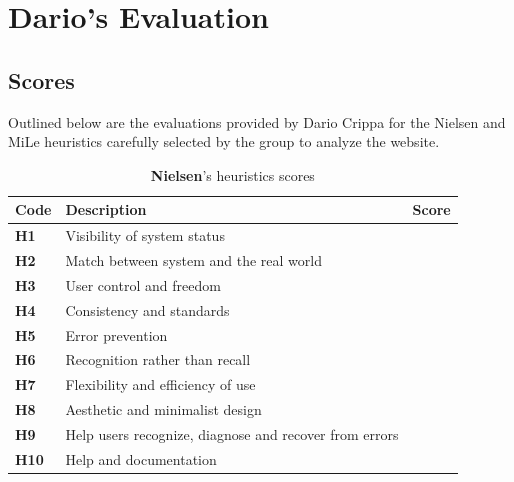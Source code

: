 \section{Dario's Evaluation}
\subsection{Scores}
Outlined below are the evaluations provided by Dario Crippa for the Nielsen and MiLe heuristics carefully selected by the group to analyze the website.\\
\begin{table}[htp!]
    \centering
    \begin{tabular}{ |l|l|c| }
        \hline
        \textbf{Code} & \textbf{Description} & \textbf{Score}\\
        \hline
        \textbf{H1} & Visibility of system status & \textbf{\color{unicefOrange}{3}}\\
        \hline
        \textbf{H2} & Match between system and the real world & \textbf{\color{unicefGreen}{5}}\\
        \hline
        \textbf{H3} & User control and freedom & \textbf{\color{unicefRed}{2}}\\
        \hline
        \textbf{H4} & Consistency and standards & \textbf{\color{unicefGreen}{5}}\\
        \hline
        \textbf{H5} & Error prevention & \textbf{\color{unicefGreen}{4}}\\
        \hline
        \textbf{H6} & Recognition rather than recall & \textbf{\color{unicefGreen}{5}}\\
        \hline
        \textbf{H7} & Flexibility and efficiency of use & \textbf{\color{unicefOrange}{3}}\\
        \hline
        \textbf{H8} & Aesthetic and minimalist design & \textbf{\color{unicefOrange}{3}}\\
        \hline
        \textbf{H9} & Help users recognize, diagnose and recover from errors & \textbf{\color{unicefGray}{n.a}}\\
        \hline
        \textbf{H10} & Help and documentation & \textbf{\color{unicefGreen}{4}}\\
        \hline
    \end{tabular}
    \caption{\textbf{Nielsen}'s heuristics scores}
\end{table}
